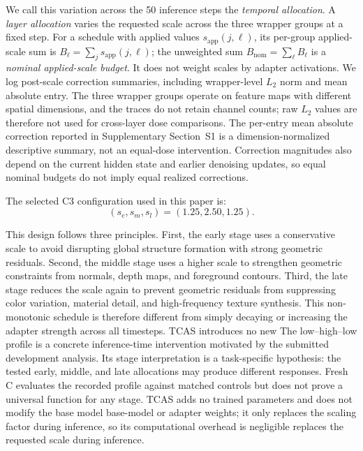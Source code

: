 \documentclass[times,twocolumn,final]{elsarticle}
\providecommand{\DIFadd}[1]{{\protect\color{blue} \sf #1}} %
\providecommand{\DIFdel}[1]{{\protect\color{red} \scriptsize #1}} %
\providecommand{\DIFaddbegin}{} %
\providecommand{\DIFaddend}{} %
\providecommand{\DIFdelbegin}{} %
\providecommand{\DIFdelend}{} %
\begin{document}
\DIFaddbegin \DIFadd{We call this variation across the 50 inference steps the \emph{temporal allocation}. A \emph{layer allocation} varies the requested scale across the three wrapper groups at a fixed step. For a schedule with applied values $s_{\mathrm{app}}(j,\ell)$, its per-group applied-scale sum is $B_\ell=\sum_j s_{\mathrm{app}}(j,\ell)$; the unweighted sum $B_{\mathrm{nom}}=\sum_\ell B_\ell$ is a \emph{nominal applied-scale budget}. It does not weight scales by adapter activations. We log post-scale correction summaries, including wrapper-level $L_2$ norm and mean absolute entry. The three wrapper groups operate on feature maps with different spatial dimensions, and the traces do not retain channel counts; raw $L_2$ values are therefore not used for cross-layer dose comparisons. The per-entry mean absolute correction reported in Supplementary Section~S1 is a dimension-normalized descriptive summary, not an equal-dose intervention. Correction magnitudes also depend on the current hidden state and earlier denoising updates, so equal nominal budgets do not imply equal realized corrections.
}

\DIFaddend The selected C3 configuration used in this paper is:
\begin{equation}
(s_e, s_m, s_l) = (1.25, 2.50, 1.25).
\end{equation}

\DIFdelbegin \DIFdel{This design follows three principles. First, the early stage uses a conservative scale to avoid disrupting global structure formation with strong geometric residuals. Second, the middle stage uses a higher scale to strengthen geometric constraints from normals, depth maps, and foreground contours. Third, the late stage reduces the scale again to prevent geometric residuals from suppressing color variation, material detail, and high-frequency texture synthesis. This non-monotonic schedule is therefore different from simply decaying or increasing the adapter strength across all timesteps. TCAS introduces no new }\DIFdelend \DIFaddbegin \DIFadd{The low--high--low profile is a concrete inference-time intervention motivated by the submitted development analysis. Its stage interpretation is a task-specific hypothesis: the tested early, middle, and late allocations may produce different responses. Fresh C evaluates the recorded profile against matched controls but does not prove a universal function for any stage. TCAS adds no trained }\DIFaddend parameters and does not modify \DIFdelbegin \DIFdel{the base model }\DIFdelend \DIFaddbegin \DIFadd{base-model }\DIFaddend or adapter weights; it \DIFdelbegin \DIFdel{only replaces the scaling factor during inference, so its computational overhead is negligible}\DIFdelend \DIFaddbegin \DIFadd{replaces the requested scale during inference}\DIFaddend .
\end{document}
